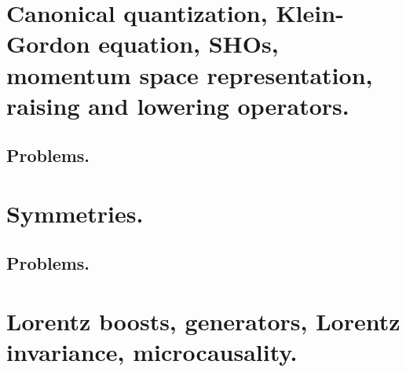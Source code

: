    \chapter{Canonical quantization, Klein-Gordon equation, SHOs, momentum space representation, raising and lowering operators.}
      
      
      
      \section{Problems.}
         
         
         
         
         
   \chapter{Symmetries.}
      
      
      
      
      \section{Problems.}
         
         
         
         
         
   \chapter{Lorentz boosts, generators, Lorentz invariance, microcausality.}
      
      
